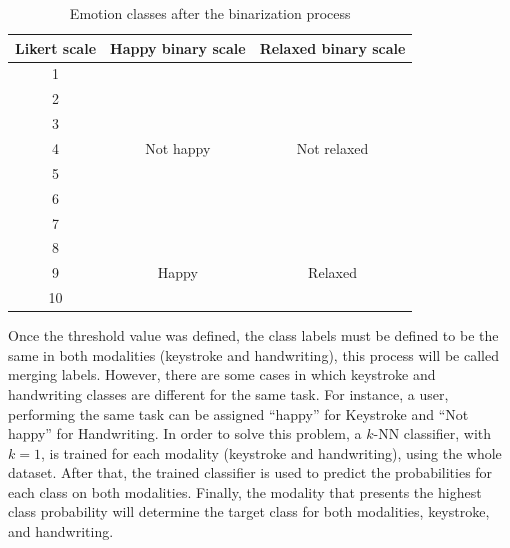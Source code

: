 \documentclass[conference]{IEEEtran}
\begin{document}
\begin{table}[htb]
    \centering
    \caption{Emotion classes after the binarization process}
    \label{tab:binary-emotions}
    \begin{tabular}{|c|c|c|}
    \hline
    \multicolumn{1}{|c|}{\textbf{Likert scale}} & \textbf{Happy binary scale} & \textbf{Relaxed binary scale} \\ \hline
    1                                           & \multirow{7}{*}{Not happy}  & \multirow{7}{*}{Not relaxed}  \\ \cline{1-1}
    2                                           &                             &                               \\ \cline{1-1}
    3                                           &                             &                               \\ \cline{1-1}
    4                                           &                             &                               \\ \cline{1-1}
    5                                           &                             &                               \\ \cline{1-1}
    6                                           &                             &                               \\ \cline{1-1}
    7                                           &                             &                               \\ \hline
    8                                           & \multirow{3}{*}{Happy}      & \multirow{3}{*}{Relaxed}      \\ \cline{1-1}
    9                                           &                             &                               \\ \cline{1-1}
    10                                          &                             &                               \\ \hline
    \end{tabular}
\end{table}



Once the threshold value was defined, the class labels must be defined to be the same in both modalities (keystroke and handwriting), this process will be called merging labels. However, there are some cases in which keystroke and handwriting classes are different for the same task. For instance, a user, performing the same task can be assigned ``happy'' for Keystroke and ``Not happy'' for Handwriting.
In order to solve this problem, a $k$-NN classifier, with $k = 1$, is trained for each modality (keystroke and handwriting), using the whole dataset. After that, the trained classifier is used to predict the probabilities for each class on both modalities. Finally, the modality that presents the highest class probability will determine the target class for both modalities, keystroke, and handwriting.  
\end{document}
